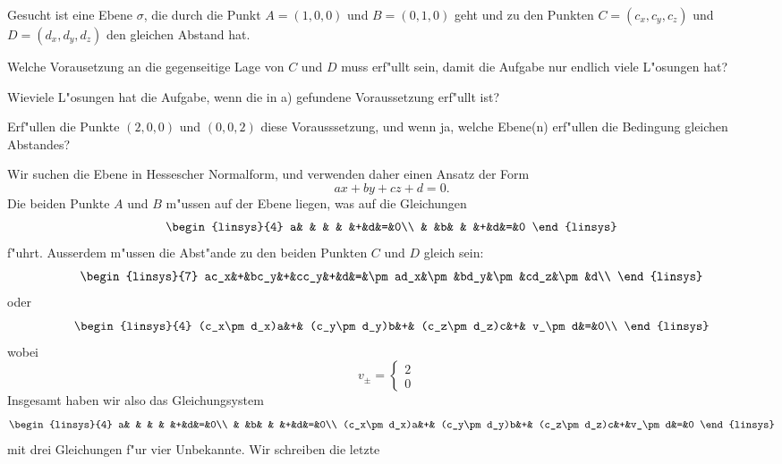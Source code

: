 Gesucht ist eine Ebene $\sigma$, die durch die Punkt $A=(1,0,0)$
und $B=(0,1,0)$ geht 
und zu den Punkten $C=(c_x,c_y,c_z)$ und $D=(d_x,d_y,d_z)$
den gleichen Abstand hat.
\begin{teilaufgaben}
\item Welche Vorausetzung an die gegenseitige Lage von $C$ und $D$
muss erf"ullt sein, damit die Aufgabe nur endlich viele L"osungen hat?
\item Wieviele L"osungen hat die Aufgabe, wenn die in a) gefundene
Voraussetzung erf"ullt ist?
\item Erf"ullen die Punkte $(2,0,0)$ und $(0,0,2)$ diese Vorausssetzung,
und wenn ja, welche Ebene(n) erf"ullen die Bedingung gleichen Abstandes?
\end{teilaufgaben}

\begin{loesung}
\begin{teilaufgaben}
\item
Wir suchen die Ebene in Hessescher Normalform, und verwenden daher einen
Ansatz der Form
\[
ax+by+cz+d=0.
\]
Die beiden Punkte $A$ und $B$ m"ussen auf der Ebene liegen,
was auf die Gleichungen
\[
\begin{linsys}{4}
a& & & &   &+&d&=&0\\
 & &b& &   &+&d&=&0
\end{linsys}
\]
f"uhrt.
Ausserdem m"ussen die Abst"ande zu den beiden Punkten $C$ und $D$ gleich
sein:
\[
\begin{linsys}{7}
ac_x&+&bc_y&+&cc_y&+&d&=&\pm ad_x&\pm&bd_y&\pm&cd_z&\pm&d\\
\end{linsys}
\]
oder
\begin{equation}
\begin{linsys}{4}
(c_x\pm d_x)a&+& (c_y\pm d_y)b&+& (c_z\pm d_z)c&+& v_\pm d&=&0\\
\end{linsys}
\label{30000032:vorzeichen}
\end{equation}
wobei
\[
v_\pm=\begin{cases}
2&\\
0&
\end{cases}
\]
Insgesamt haben wir also das Gleichungsystem
\[
\begin{linsys}{4}
a& & & &   &+&d&=&0\\
 & &b& &   &+&d&=&0\\
(c_x\pm d_x)a&+& (c_y\pm d_y)b&+& (c_z\pm d_z)c&+&v_\pm d&=&0
\end{linsys}
\]
mit drei Gleichungen f"ur vier Unbekannte. Wir schreiben die letzte

\end{teilaufgaben}
\end{loesung}
